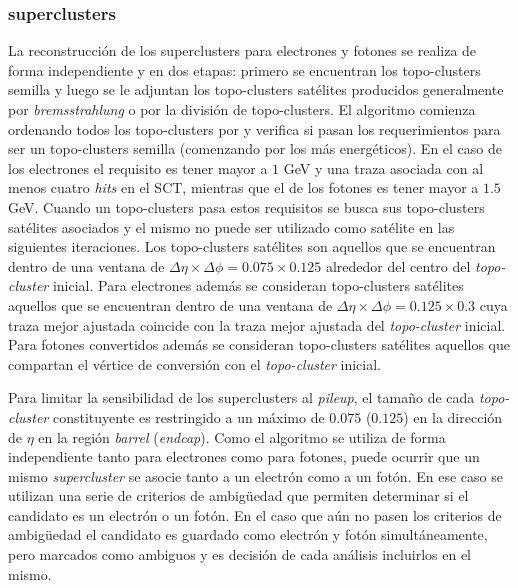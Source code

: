\subsubsection{superclusters}

La reconstrucción de los superclusters para electrones y fotones se realiza de forma independiente y en dos etapas: primero se encuentran los topo-clusters semilla 
 y luego se le adjuntan los topo-clusters satélites producidos generalmente por \textit{bremsstrahlung} o por la división de topo-clusters. El algoritmo comienza ordenando todos los topo-clusters por \ET y verifica si pasan los requerimientos para ser un topo-clusters semilla (comenzando por los más energéticos). En el caso de los electrones el requisito es tener \ET mayor a $1$ GeV y una traza asociada con al menos cuatro \textit{hits} en el SCT, mientras que el de los fotones es tener \ET mayor a $1.5$ GeV. Cuando un topo-clusters pasa estos requisitos se busca sus topo-clusters satélites asociados y el mismo no puede ser utilizado como satélite en las siguientes iteraciones. Los topo-clusters satélites son aquellos que se encuentran dentro de una ventana de $\Delta\eta\times\Delta\phi=0.075\times0.125$ alrededor del centro del \textit{topo-cluster} inicial. Para electrones además se consideran topo-clusters satélites aquellos que se encuentran dentro de una ventana de $\Delta\eta\times\Delta\phi=0.125\times0.3$ cuya traza mejor ajustada coincide con la traza mejor ajustada del \textit{topo-cluster} inicial. Para fotones convertidos además se consideran topo-clusters satélites aquellos que compartan el vértice de conversión con el \textit{topo-cluster} inicial. 

Para limitar la sensibilidad de los superclusters al \textit{pileup}, el tamaño de cada \textit{topo-cluster} constituyente es restringido a un máximo de $0.075$ ($0.125$) en la dirección de $\eta$  en la región \textit{barrel} (\textit{endcap}). Como el algoritmo se utiliza de forma independiente tanto para electrones como para fotones, puede ocurrir que un mismo \textit{supercluster} se asocie tanto a un electrón como a un fotón. En ese caso se utilizan una serie de criterios de ambigüedad que permiten determinar si el candidato es un electrón o un fotón. En el caso que aún no pasen los criterios de ambigüedad el candidato es guardado como electrón y fotón simultáneamente, pero marcados como ambiguos y es decisión de cada análisis incluirlos en el mismo.

